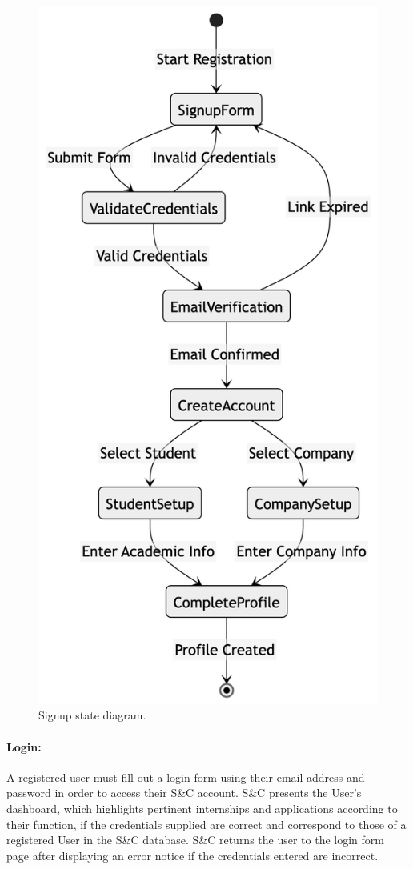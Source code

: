 \begin{figure}[H]
    \begin{center}
        \includegraphics[width=0.5\linewidth]{JhaBhatiaSharma/Images/State Diagrams/SignUp.png}
        \caption{Signup state diagram.}
        \label{fig:signup_sd}%
    \end{center}
\end{figure}

\paragraph{Login:}
A registered user must fill out a login form using their email address and password in order to access their S\&C account. S\&C presents the User's dashboard, which highlights pertinent internships and applications according to their function, if the credentials supplied are correct and correspond to those of a registered User in the S\&C database. S\&C returns the user to the login form page after displaying an error notice if the credentials entered are incorrect.



